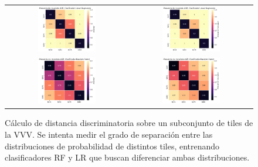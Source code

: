 \begin{figure}[h!]
\begin{tabular}{cc}

\includegraphics[width=0.49\textwidth]{Kap8/CS-Method+Linear_Regressionmetricaccuracy.png} & \includegraphics[width=0.49\textwidth]{Kap8/CS-Method+Linear_Regressionmetricauc.png}  \\

\includegraphics[width=0.49\textwidth]{Kap8/CS-Method+Random_Forestmetricaccuracy.png}  & \includegraphics[width=0.49\textwidth]{Kap8/CS-Method+Random_Forestmetricauc.png} 
\end{tabular}
\caption{Cálculo de distancia discriminatoria sobre un subconjunto de tiles de la VVV. Se intenta medir el grado de separación entre las distribuciones de probabilidad de distintos tiles, entrenando clasificadores RF y LR que buscan diferenciar ambas distribuciones.}
\label{fig:covariate_matrix}
\end{figure}


